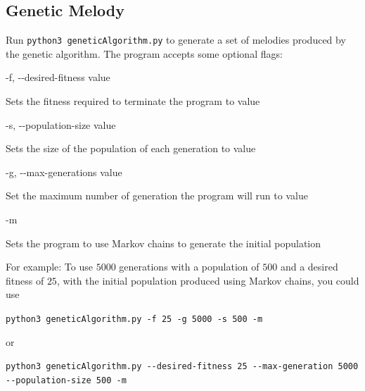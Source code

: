 \subsection{Genetic Melody} \label{software:howtouse:ga}

Run \texttt{python3 geneticAlgorithm.py} to generate a set of melodies produced by the genetic algorithm.
The program accepts some optional flags:

\noindent -f, -{}-desired-fitness value 

Sets the fitness required to terminate the program to value

\noindent -s, -{}-population-size value

Sets the size of the population of each generation to value

\noindent -g, -{}-max-generations value

Set the maximum number of generation the program will run to value

\noindent -m

Sets the program to use Markov chains to generate the initial population

For example: To use $5000$ generations with a population of $500$ and a desired fitness of $25$, with the initial population produced using Markov chains, you could use

\texttt{python3 geneticAlgorithm.py -f 25 -g 5000 -s 500 -m}

\noindent or

\texttt{python3 geneticAlgorithm.py -{}-desired-fitness 25 -{}-max-generation 5000 -{}-population-size 500 -m}
